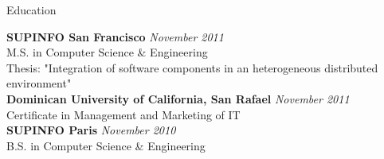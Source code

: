 \documentclass{resume} %
\begin{document}

\begin{rSection}{Education}

{\bf SUPINFO San Francisco} \hfill {\em November 2011} \\
M.S. in Computer Science \& Engineering \\
Thesis: "Integration of software components in an heterogeneous distributed environment" \\

{\bf Dominican University of California, San Rafael} \hfill {\em November 2011} \\
Certificate in Management and Marketing of IT \\

{\bf SUPINFO Paris} \hfill {\em November 2010} \\
B.S. in Computer Science \& Engineering \\

\end{rSection}

\end{document}
